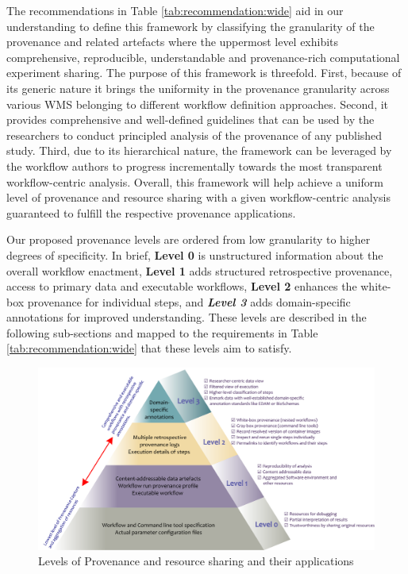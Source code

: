 \documentclass[a4paper,num-refs]{oup-contemporary}
\begin{document}
The recommendations in Table \ref{tab:recommendation:wide} aid in our understanding to define this framework by classifying the granularity of the provenance and related artefacts where the uppermost level exhibits comprehensive, reproducible, understandable and provenance-rich computational experiment sharing. The purpose of this framework is threefold. First, because of its generic nature it brings the uniformity in the provenance granularity across various WMS belonging to different workflow definition approaches. Second, it provides comprehensive and well-defined guidelines that can be used by the researchers to conduct principled analysis of the provenance of any published study. Third, due to its hierarchical nature, the framework can be leveraged by the workflow authors to progress incrementally towards the most transparent workflow-centric analysis. Overall, this framework will help achieve a uniform level of provenance and resource sharing with a given workflow-centric analysis guaranteed to fulfill the respective provenance applications.

Our proposed provenance levels are ordered from low granularity to higher degrees of specificity. In brief, \textbf{Level 0} is unstructured information about the overall workflow enactment, \textbf{Level 1} adds structured retrospective  provenance, access to primary data and executable workflows, \textbf{Level 2} enhances the white-box provenance for individual steps, and \textbf{\textit{Level 3}} adds domain-specific annotations for improved understanding. These levels are described in the following sub-sections and mapped to the requirements in Table \ref{tab:recommendation:wide} that these levels aim to satisfy.

\begin{figure} %
\centering
\includegraphics[width=.9\textwidth]{images/ProvenanceLevels}
\captionsetup{justification=centering}
\caption{Levels of Provenance and resource sharing and their applications}\label{fig:levels}
\end{figure}
\end{document}
